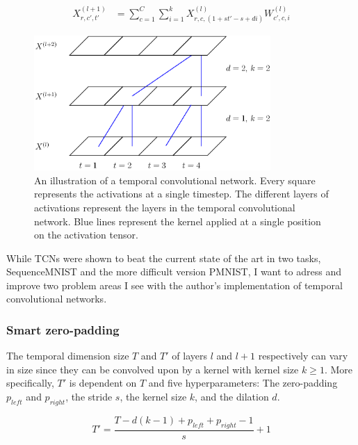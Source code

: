 \documentclass[a4paper, twoside]{article}
\begin{document}
\begin{equation}\label{konvolution}
\begin{split}
	X^{(l+1)}_{r, c', t'}	
		& = \sum^{C}_{c=1} \sum^{k}_{i=1} X^{(l)}_{r, c, (1 + st'-s+di)}W^{(l)}_{c', c, i}
\end{split}
\end{equation}

\begin{figure}[h]
\begin{center}
    \includegraphics[width=9cm]{figTCNdil.eps}\caption{An illustration of a temporal convolutional network. Every square represents the activations at a single timestep. The different layers of activations represent the layers in the temporal convolutional network. Blue lines represent the kernel applied at a single position on the activation tensor.} 
    
    \label{figTCNdil}
\end{center}
\end{figure}

While TCNs \cite{tcn} were shown to beat the current state of the art in two tasks, SequenceMNIST and the more difficult version PMNIST, I want to adress and improve two problem areas I see with the author's implementation of temporal convolutional networks.

\subsubsection{Smart zero-padding}
The temporal dimension size $T$ and $T'$ of layers $l$ and $l+1$ respectively can vary in size since they can be convolved upon by a kernel with kernel size $k \geq 1$. More specifically, $T'$ is dependent on $T$ and five hyperparameters: The zero-padding $p_{left}$ and $p_{right}$, the stride $s$, the kernel size $k$, and the dilation $d$.

\begin{equation}
T' = \frac{T-d(k-1)+p_{left}+p_{right}-1}{s}+1
\end{equation}
\end{document}
